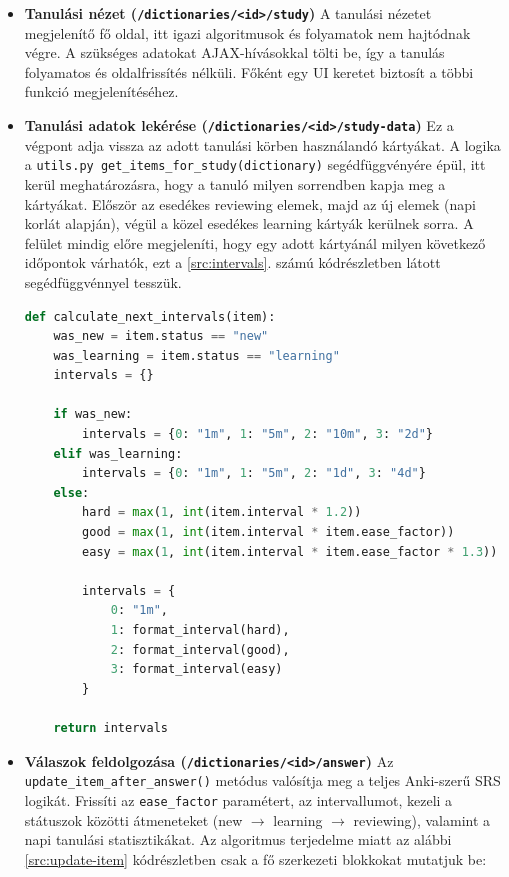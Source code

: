 \begin{itemize}
  \item \textbf{Tanulási nézet (\texttt{/dictionaries/<id>/study})} A tanulási nézetet megjelenítő fő oldal, itt igazi algoritmusok és folyamatok nem hajtódnak végre. A szükséges adatokat AJAX-hívásokkal tölti be, így a tanulás folyamatos és oldalfrissítés nélküli. Főként egy UI keretet biztosít a többi funkció megjelenítéséhez. 
  \item \textbf{Tanulási adatok lekérése (\texttt{/dictionaries/<id>/study-data})} Ez a végpont adja vissza az adott tanulási körben használandó kártyákat. A logika a \texttt{utils.py get\_items\_for\_study(dictionary)} segédfüggvényére épül, itt kerül meghatározásra, hogy a tanuló milyen sorrendben kapja meg a kártyákat. Először az esedékes reviewing elemek, majd az új elemek (napi korlát alapján), végül a közel esedékes learning kártyák kerülnek sorra. A felület mindig előre megjeleníti, hogy egy adott kártyánál milyen következő időpontok várhatók, ezt a \ref{src:intervals}. számú kódrészletben látott segédfüggvénnyel tesszük.

\begin{lstlisting}[language=Python]
def calculate_next_intervals(item):
    was_new = item.status == "new"
    was_learning = item.status == "learning"
    intervals = {}

    if was_new:
        intervals = {0: "1m", 1: "5m", 2: "10m", 3: "2d"}
    elif was_learning:
        intervals = {0: "1m", 1: "5m", 2: "1d", 3: "4d"}
    else:
        hard = max(1, int(item.interval * 1.2))
        good = max(1, int(item.interval * item.ease_factor))
        easy = max(1, int(item.interval * item.ease_factor * 1.3))

        intervals = {
            0: "1m",
            1: format_interval(hard),
            2: format_interval(good),
            3: format_interval(easy)
        }

    return intervals
\end{lstlisting}

  \item \textbf{Válaszok feldolgozása (\texttt{/dictionaries/<id>/answer})} Az \texttt{update\_item\_after\_answer()} metódus valósítja meg a teljes Anki-szerű SRS logikát. Frissíti az \texttt{ease\_factor} paramétert, az intervallumot, kezeli a státuszok közötti átmeneteket (new $\rightarrow$ learning $\rightarrow$ reviewing), valamint a napi tanulási statisztikákat. Az algoritmus terjedelme miatt az alábbi \ref{src:update-item} kódrészletben csak a fő szerkezeti blokkokat mutatjuk be:


\end{itemize}
